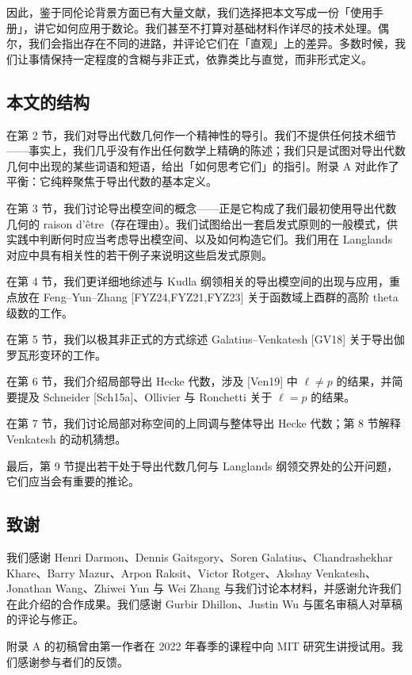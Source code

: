 因此，鉴于同伦论背景方面已有大量文献，我们选择把本文写成一份「使用手册」，讲它如何应用于数论。我们甚至不打算对基础材料作详尽的技术处理。偶尔，我们会指出存在不同的进路，并评论它们在「直观」上的差异。多数时候，我们让事情保持一定程度的含糊与非正式，依靠类比与直觉，而非形式定义。

\subsection{本文的结构}

在第 2 节，我们对导出代数几何作一个精神性的导引。我们不提供任何技术细节——事实上，我们几乎没有作出任何数学上精确的陈述；我们只是试图对导出代数几何中出现的某些词语和短语，给出「如何思考它们」的指引。附录 A 对此作了平衡：它纯粹聚焦于导出代数的基本定义。

在第 3 节，我们讨论导出模空间的概念——正是它构成了我们最初使用导出代数几何的 raison d'être（存在理由）。我们试图给出一套启发式原则的一般模式，供实践中判断何时应当考虑导出模空间、以及如何构造它们。我们用在 Langlands 对应中具有相关性的若干例子来说明这些启发式原则。

在第 4 节，我们更详细地综述与 Kudla 纲领相关的导出模空间的出现与应用，重点放在 Feng--Yun--Zhang [FYZ24,FYZ21,FYZ23] 关于函数域上酉群的高阶 theta 级数的工作。

在第 5 节，我们以极其非正式的方式综述 Galatius--Venkatesh [GV18] 关于导出伽罗瓦形变环的工作。

在第 6 节，我们介绍局部导出 Hecke 代数，涉及 [Ven19] 中 $\ell\neq p$ 的结果，并简要提及 Schneider [Sch15a]、Ollivier 与 Ronchetti 关于 $\ell=p$ 的结果。

在第 7 节，我们讨论局部对称空间的上同调与整体导出 Hecke 代数；第 8 节解释 Venkatesh 的动机猜想。

最后，第 9 节提出若干处于导出代数几何与 Langlands 纲领交界处的公开问题，它们应当会有重要的推论。

\subsection{致谢}

我们感谢 Henri Darmon、Dennis Gaitsgory、Soren Galatius、Chandrashekhar Khare、Barry Mazur、Arpon Raksit、Victor Rotger、Akshay Venkatesh、Jonathan Wang、Zhiwei Yun 与 Wei Zhang 与我们讨论本材料，并感谢允许我们在此介绍的合作成果。我们感谢 Gurbir Dhillon、Justin Wu 与匿名审稿人对草稿的评论与修正。

附录 A 的初稿曾由第一作者在 2022 年春季的课程中向 MIT 研究生讲授试用。我们感谢参与者们的反馈。

